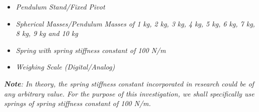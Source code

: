 \begin{itemize}
    \item \textit{Pendulum Stand/Fixed Pivot}
    \item \textit{Spherical Masses/Pendulum Masses of 1 kg, 2 kg, 3 kg, 4 kg, 5 kg, 6 kg, 7 kg, 8 kg, 9 kg and 10 kg}
    \item \textit{Spring with spring stiffness constant of 100 N/m}
    \item \textit{Weighing Scale (Digital/Analog)}
    \label{mat}
\end{itemize}

\textit{\textbf{Note}: In theory, the spring stiffness constant incorporated in research could be of any arbitrary value. For the purpose of this investigation, we shall specifically use springs of spring stiffness constant of 100 N/m.}


